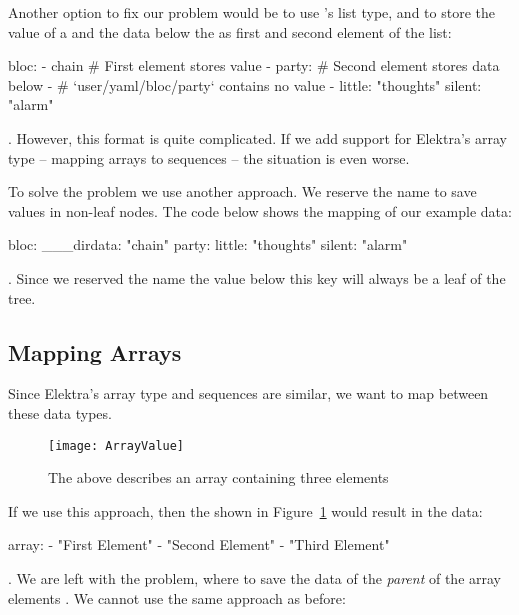 Another option to fix our problem would be to use ’s list type, and to store the value of a  and the data below the  as first and second element of the list:

\begin{yamlcode}
  bloc:
    - chain                 # First element stores value
    - party:                # Second element stores data below
      -                     # `user/yaml/bloc/party` contains no value
      - little: "thoughts"
        silent: "alarm"
\end{yamlcode}

. However, this format is quite complicated. If we add support for Elektra’s array type – mapping arrays to  sequences – the situation is even worse.

To solve the problem we use another approach. We reserve the name  to save values in non-leaf nodes. The code below shows the mapping of our example data:

\begin{yamlcode}
  bloc:
    ___dirdata: "chain"
    party:
      little: "thoughts"
      silent: "alarm"
\end{yamlcode}

. Since we reserved the name  the value below this key will always be a leaf of the tree.

\subsection{Mapping Arrays}

Since Elektra’s array type and  sequences are similar, we want to map between these data types.

\begin{figure}
  \centering
    \texttt{[image: ArrayValue]}
  \caption{The  above describes an array containing three elements}
  \label{fig:array_value}
\end{figure}

If we use this approach, then the  shown in Figure~\ref{fig:array_value} would result in the  data:

\begin{yamlcode}
  array:
    - "First Element"
    - "Second Element"
    - "Third Element"
\end{yamlcode}

. We are left with the problem, where to save the data of the \emph{parent}  of the array elements . We cannot use the same approach as before:

